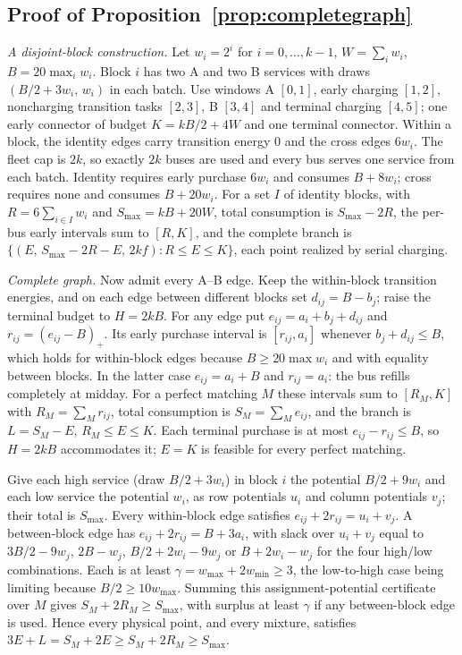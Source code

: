\subsection{Proof of Proposition~\ref{prop:completegraph}}
\emph{A disjoint-block construction.} Let $w_i=2^i$ for $i=0,\dots,k-1$,
$W=\sum_iw_i$, $B=20\max_iw_i$. Block $i$ has two A and two B services with draws
$(B/2+3w_i,\,w_i)$ in each batch. Use windows A $[0,1]$, early charging $[1,2]$,
noncharging transition tasks $[2,3]$, B $[3,4]$ and terminal charging $[4,5]$; one
early connector of budget $K=kB/2+4W$ and one terminal connector. Within a block,
the identity edges carry transition energy $0$ and the cross edges $6w_i$. The fleet
cap is $2k$, so exactly $2k$ buses are used and every bus serves one service from
each batch. Identity requires early purchase $6w_i$ and consumes $B+8w_i$; cross
requires none and consumes $B+20w_i$. For a set $I$ of identity blocks, with
$R=6\sum_{i\in I}w_i$ and $S_{\max}=kB+20W$, total consumption is $S_{\max}-2R$, the
per-bus early intervals sum to $[R,K]$, and the complete branch is
$\{(E,\,S_{\max}-2R-E,\,2kf):R\le E\le K\}$, each point realized by serial charging.

\emph{Complete graph.} Now admit every A--B edge. Keep the within-block transition
energies, and on each edge between different blocks set $d_{ij}=B-b_j$; raise the
terminal budget to $H=2kB$. For any edge put $e_{ij}=a_i+b_j+d_{ij}$ and
$r_{ij}=(e_{ij}-B)_+$. Its early purchase interval is $[r_{ij},a_i]$ whenever
$b_j+d_{ij}\le B$, which holds for within-block edges because $B\ge20\max w_i$ and
with equality between blocks. In the latter case $e_{ij}=a_i+B$ and $r_{ij}=a_i$: the
bus refills completely at midday. For a perfect matching $M$ these intervals sum
to $[R_M,K]$ with $R_M=\sum_Mr_{ij}$, total consumption is $S_M=\sum_Me_{ij}$, and the
branch is $L=S_M-E$, $R_M\le E\le K$. Each terminal purchase is at most
$e_{ij}-r_{ij}\le B$, so $H=2kB$ accommodates it; $E=K$ is feasible for every
perfect matching.

Give each high service (draw $B/2+3w_i$) in block $i$ the potential $B/2+9w_i$ and
each low service the potential $w_i$, as row potentials $u_i$ and column potentials
$v_j$; their total is $S_{\max}$. Every within-block edge satisfies
$e_{ij}+2r_{ij}=u_i+v_j$. A between-block edge has $e_{ij}+2r_{ij}=B+3a_i$, with slack
over $u_i+v_j$ equal to $3B/2-9w_j$, $2B-w_j$, $B/2+2w_i-9w_j$ or $B+2w_i-w_j$ for the
four high/low combinations. Each is at least $\gamma=w_{\max}+2w_{\min}\ge3$, the
low-to-high case being limiting because $B/2\ge10w_{\max}$. Summing this
assignment-potential certificate over $M$ gives $S_M+2R_M\ge S_{\max}$, with surplus at
least $\gamma$ if any between-block edge is used. Hence every physical point, and
every mixture, satisfies $3E+L=S_M+2E\ge S_M+2R_M\ge S_{\max}$.

